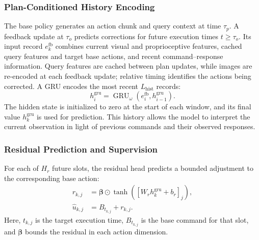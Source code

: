 \subsubsection{Plan-Conditioned History Encoding}
The base policy generates an action chunk and query context at time $\tau_p$.
A feedback update at $\tau_o$ predicts corrections for future execution times $t\ge\tau_o$.
Its input record $e_k^{\mathrm{fb}}$ combines current visual and proprioceptive features, cached query features and target base actions, and recent command--response information.
Query features are cached between plan updates, while images are re-encoded at each feedback update; relative timing identifies the actions being corrected.
A GRU encodes the most recent $L_{\mathrm{hist}}$ records:
\begin{equation}
 h_i^{\mathrm{gru}}
 =\operatorname{GRU}_{\omega}
   (e_i^{\mathrm{fb}},h_{i-1}^{\mathrm{gru}}).
 \label{eq:methodgru}
\end{equation}
The hidden state is initialized to zero at the start of each window, and its final value $h_k^{\mathrm{gru}}$ is used for prediction.
This history allows the model to interpret the current observation in light of previous commands and their observed responses.


\subsubsection{Residual Prediction and Supervision}
For each of $H_r$ future slots, the residual head predicts a bounded adjustment to the corresponding base action:
\begin{equation}
 \begin{aligned}
 r_{k,j}&=\bm\beta\odot
    \tanh([W_rh_k^{\mathrm{gru}}+b_r]_j),\\
 \widehat u_{k,j}&=B_{t_{k,j}}+r_{k,j}.
 \end{aligned}
 \label{eq:methodresidual}
\end{equation}
Here, $t_{k,j}$ is the target execution time, $B_{t_{k,j}}$ is the base command for that slot, and $\bm\beta$ bounds the residual in each action dimension.

